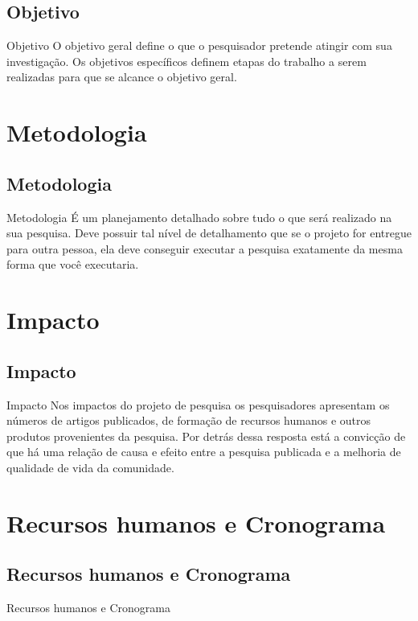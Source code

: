 \documentclass{libs/ufrb_format}
\begin{document}
\subsection{Objetivo}
\begin{frame}{Objetivo}
O objetivo geral define o que o pesquisador pretende atingir com sua investigação. Os objetivos específicos definem etapas do trabalho a serem realizadas para que se alcance o objetivo geral.
\end{frame}

\section{Metodologia}
\subsection{Metodologia}
\begin{frame}{Metodologia}
É um planejamento detalhado sobre tudo o que será realizado na sua pesquisa. Deve possuir tal nível de detalhamento que se o projeto for entregue para outra pessoa, ela deve conseguir executar a pesquisa exatamente da mesma forma que você executaria.
\end{frame}


\section{Impacto}
\subsection{Impacto}
\begin{frame}{Impacto}
Nos impactos do projeto de pesquisa os pesquisadores apresentam os números de artigos publicados, de formação de recursos humanos e outros produtos provenientes da pesquisa. Por detrás dessa resposta está a convicção de que há uma relação de causa e efeito entre a pesquisa publicada e a melhoria de qualidade de vida da comunidade.
\end{frame}

\section{Recursos humanos e Cronograma}
\subsection{Recursos humanos e Cronograma}
\begin{frame}{Recursos humanos e Cronograma}

\end{frame}
\end{document}
